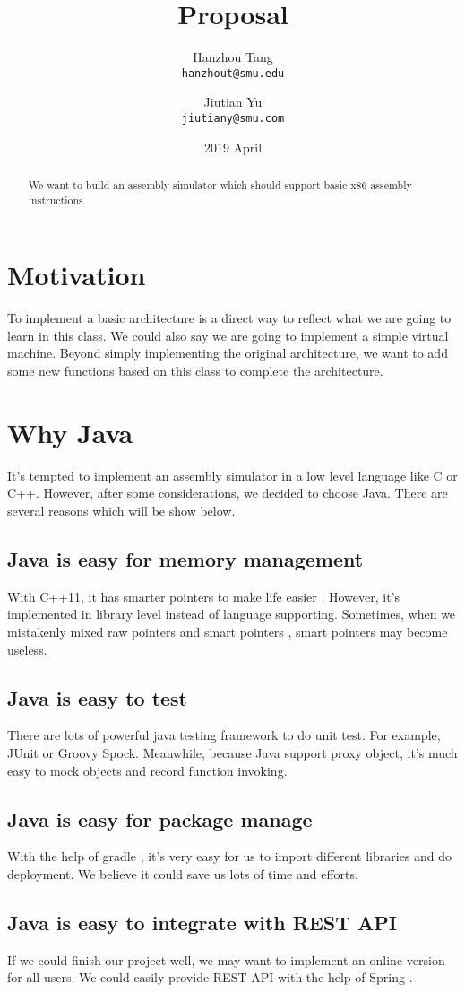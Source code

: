 \documentclass[12pt]{extarticle}
\title{Proposal}
\author{
Hanzhou Tang \\
\texttt{hanzhout@smu.edu}
\and 
Jiutian Yu \\
\texttt{jiutiany@smu.com}
}
\date{ 2019 April}
\begin{document}
\maketitle
\begin{abstract}
We want to build an assembly simulator which should support basic x86 assembly instructions.
\end{abstract}
\section{Motivation}
To implement a basic architecture is a direct way to reflect what we are going to learn in this class. We could also say we are going to implement a simple virtual machine. Beyond simply implementing the original architecture, we want to add some new functions based on this class to complete the architecture.  
\section{Why Java}
It's tempted to implement an assembly simulator in a low level language like C or C++. However, after some considerations, we decided to choose Java.
There are several reasons which will be show below. 
\subsection{Java is easy for memory management}
With C++11, it has smarter pointers to make life easier \cite{josuttis2012c++}. 
However, it's implemented in library level instead of language supporting.
Sometimes, when we mistakenly mixed raw pointers and smart pointers , smart pointers may become useless.
\subsection{Java is easy to test}
There are lots of powerful java testing framework to do unit test. For example, JUnit or Groovy Spock. 
Meanwhile, because Java support proxy object, it's much easy to mock objects and record function invoking.
\subsection{Java is easy for package manage}
With the help of gradle \cite{muschko2014gradle}, it's very easy for us to import different libraries and do deployment. We believe it could save us lots of time and efforts.
\subsection{Java is easy to integrate with REST API}
If we could finish our project well, we may want to implement an online version for all users. We could easily provide REST API with the help of Spring \cite{walls2005spring}.
\end{document}
